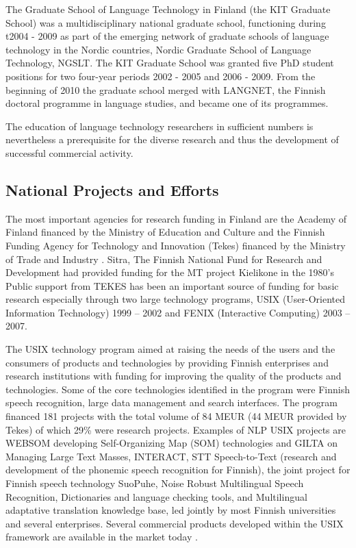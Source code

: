 \documentclass[]{../../metanetpaper}
\begin{document}
\begin{multicols}{2}
The Graduate School of Language Technology in Finland (the KIT Graduate School)
was a multidisciplinary national graduate school, functioning during t2004 -
2009 as part of the emerging network of graduate schools of language technology
in the Nordic countries, Nordic Graduate School of Language Technology, NGSLT.
The KIT Graduate School was granted five PhD student positions for two
four-year periods 2002 - 2005 and 2006 - 2009. From the beginning of 2010 the
graduate school merged with LANGNET, the Finnish doctoral programme in language
studies, and became one of its programmes.

The education of language technology researchers in sufficient numbers
is nevertheless a prerequisite for the diverse research and thus the
development of successful commercial activity.\cite{FinExp}

\subsection{National Projects and Efforts}

The most important agencies for research funding in Finland are
the Academy of Finland financed by the Ministry of Education and
Culture and the Finnish Funding Agency for Technology and Innovation
(Tekes) financed by the Ministry of Trade and Industry \cite{Leading}.
Sitra, The Finnish National Fund for Research and Development had
provided funding for the MT project Kielikone in the 1980's Public
support from TEKES has been an important source of funding for basic
research especially through two large technology programs, USIX
(User-Oriented Information Technology) 1999 – 2002 and FENIX
(Interactive Computing) 2003 – 2007.

The USIX technology program aimed at raising the needs of the users and the
consumers of products and technologies by providing Finnish enterprises and
research institutions with funding for improving the quality of the products
and technologies. Some of the core technologies identified in the program were
Finnish speech recognition, large data management and search interfaces. The
program financed 181 projects with the total volume of 84 MEUR (44 MEUR
provided by Tekes) of which 29\% were research projects. Examples of NLP USIX
projects are WEBSOM developing Self-Organizing Map (SOM) technologies and GILTA
on Managing Large Text Masses, INTERACT, STT Speech-to-Text (research and
development of the phonemic speech recognition for Finnish), the joint project
for Finnish speech technology SuoPuhe, Noise Robust Multilingual Speech
Recognition, Dictionaries and language checking tools, and Multilingual
adaptative translation knowledge base, led jointly by most Finnish universities
and several enterprises. Several commercial products developed within the USIX
framework are available in the market today \cite{LoppuUSIX}.


\end{multicols}
\end{document}
